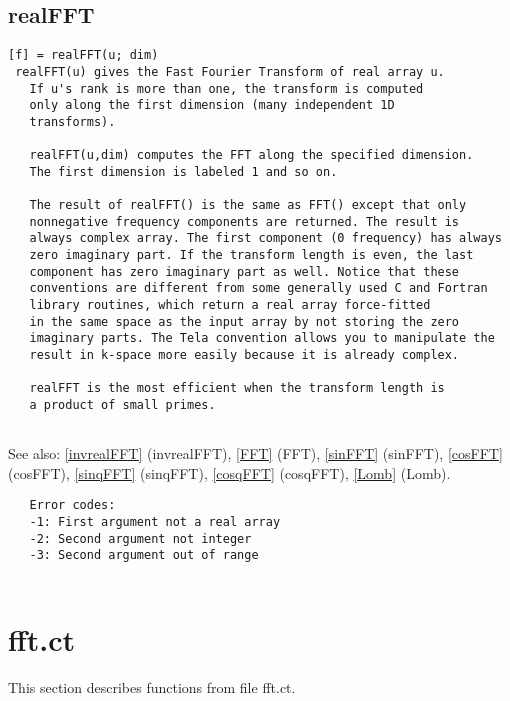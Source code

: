 \documentclass[a4paper]{article}
\begin{document}
\subsection{realFFT\label{realFFT}}

\begin{tscreen}
\begin{verbatim}
[f] = realFFT(u; dim)
 realFFT(u) gives the Fast Fourier Transform of real array u.
   If u's rank is more than one, the transform is computed
   only along the first dimension (many independent 1D
   transforms).

   realFFT(u,dim) computes the FFT along the specified dimension.
   The first dimension is labeled 1 and so on.

   The result of realFFT() is the same as FFT() except that only
   nonnegative frequency components are returned. The result is
   always complex array. The first component (0 frequency) has always
   zero imaginary part. If the transform length is even, the last
   component has zero imaginary part as well. Notice that these
   conventions are different from some generally used C and Fortran
   library routines, which return a real array force-fitted
   in the same space as the input array by not storing the zero
   imaginary parts. The Tela convention allows you to manipulate the
   result in k-space more easily because it is already complex.

   realFFT is the most efficient when the transform length is
   a product of small primes.
   
\end{verbatim}

See also: \ref{invrealFFT} {(invrealFFT)}, \ref{FFT} {(FFT)}, \ref{sinFFT} {(sinFFT)}, \ref{cosFFT} {(cosFFT)}, \ref{sinqFFT} {(sinqFFT)}, \ref{cosqFFT} {(cosqFFT)}, \ref{Lomb} {(Lomb)}.
\begin{verbatim}
   Error codes:
   -1: First argument not a real array
   -2: Second argument not integer
   -3: Second argument out of range
   
\end{verbatim}
\end{tscreen}





\section{fft.ct}

This section describes functions from file fft.ct.
\end{document}
